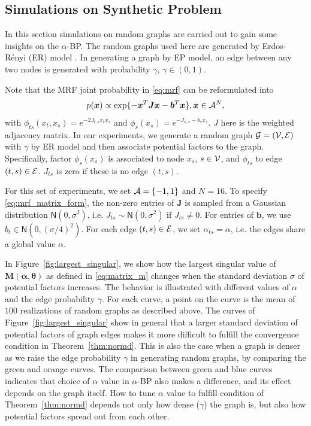 \subsection{Simulations on Synthetic Problem}

In this section simulations on random graphs are carried out
to gain some insights on the $\alpha$-BP. The random graphs used here are generated
by Erdos-R\'enyi (ER) model \cite{erdos1960}. In generating a graph by EP model, an edge between any two nodes is generated with probability $\gamma$, $\gamma \in (0,1)$.

Note that the MRF joint probability in \eqref{eq:mrf} can be reformulated into
\begin{equation}\label{eq:mrf_matrix_form}
  p(\bm{x}) \propto \exp\{-\bm{x}^{T}\bm{J}\bm{x} - \bm{b}^{T}\bm{x}\}, \bm{x} \in \mathcal{A}^N,
\end{equation}
with $\phi_{ts}(x_t, x_s) = e^{- 2 J_{t,s} x_t x_s}$ and $\phi_s(x_s) = e^{ - J_{s,s} - b_s  x_s}$. $J$ here is the weighted adjacency matrix. In our experiments, we generate a random graph $\mathcal{G} = (\mathcal{V}, \mathcal{E})$ with $\gamma$ by ER model and then associate potential factors to the graph. Specifically, factor $\phi_s(x_s)$ is associated to node $x_s$, $s \in \mathcal{V}$, and $\phi_{ts}$ to edge $(t, s) \in \mathcal{E}$. $J_{ts}$ is zero if these is no edge $(t, s)$.

For this set of experiments, we set $\mathcal{A} = \left\{ -1, 1 \right\}$ and $N=16$. To specify \eqref{eq:mrf_matrix_form}, the non-zero entries of $\bm{J}$ is sampled from a Gaussian distribution $\mathsf{N}(0, \sigma^2)$, i.e. $J_{ts} \sim \mathsf{N}(0, \sigma^2)$ if $J_{ts}\neq 0$. For entries of $\bm{b}$, we use $b_t \in \mathsf{N}(0, (\sigma/4)^2)$.
For each edge $(t,s) \in \mathcal{E}$, we set $\alpha_{ts}=\alpha$, i.e. the edges share a global value $\alpha$.

In Figure~\ref{fig:largest_singular}, we show how the largest singular value of $\bm{M}(\bm{\alpha}, \bm{\theta})$ as defined in \eqref{eq:matrix_m} changes when the standard deviation $\sigma$ of potential factors increases. The behavior is illustrated with different values of $\alpha$ and the edge probability $\gamma$. For each curve, a point on the curve is the mean of $100$ realizations of random graphs as described above. The curves of Figure~\ref{fig:largest_singular} show in general that a larger standard deviation of potential factors of graph edges makes it more difficult to fulfill the convergence condition in Theorem~\ref{thm:normd}. This is also the case when a graph is denser as we raise the edge probability $\gamma$ in generating random graphs, by comparing the green and orange curves. The comparison between green and blue curves indicates that choice of $\alpha$ value in $\alpha$-BP also makes a difference, and its effect depends on the graph itself. How to tune $\alpha$ value to fulfill condition of Theorem~\ref{thm:normd} depends not only how dense ($\gamma$) the graph is, but also how potential factors spread out from each other.

